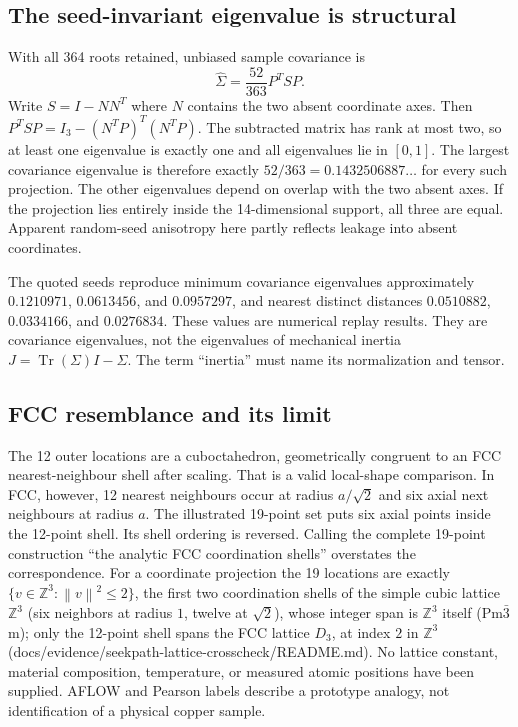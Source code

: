 \documentclass[11pt,a4paper]{article}
\newcommand{\tr}{\operatorname{Tr}}\newcommand{\TV}{\operatorname{TV}}\newcommand{\kerop}{\operatorname{ker}}\newcommand{\rank}{\operatorname{rank}}\newcommand{\diag}{\operatorname{diag}}\newcommand{\ran}{\operatorname{ran}}\newcommand{\norm}[1]{\left\lVert#1\right\rVert}\newcommand{\ket}[1]{\lvert#1\rangle}\newcommand{\bra}[1]{\langle#1\rvert}
\begin{document}
\subsection{The seed-invariant eigenvalue is structural}
With all 364 roots retained, unbiased sample covariance is
\begin{equation}
\widehat\Sigma=\frac{52}{363}P^TSP.
\end{equation}
Write $S=I-NN^T$ where $N$ contains the two absent coordinate axes. Then
$P^TSP=I_3-(N^TP)^T(N^TP)$. The subtracted matrix has rank at most two, so at least one eigenvalue is exactly one and all eigenvalues lie in $[0,1]$. The largest covariance eigenvalue is therefore exactly $52/363=0.1432506887\ldots$ for every such projection. The other eigenvalues depend on overlap with the two absent axes. If the projection lies entirely inside the 14-dimensional support, all three are equal. Apparent random-seed anisotropy here partly reflects leakage into absent coordinates.

The quoted seeds reproduce minimum covariance eigenvalues approximately $0.1210971$, $0.0613456$, and $0.0957297$, and nearest distinct distances $0.0510882$, $0.0334166$, and $0.0276834$. These values are numerical replay results. They are covariance eigenvalues, not the eigenvalues of mechanical inertia $J=\tr(\Sigma)I-\Sigma$. The term ``inertia'' must name its normalization and tensor.

\subsection{FCC resemblance and its limit}
The 12 outer locations are a cuboctahedron, geometrically congruent to an FCC nearest-neighbour shell after scaling. That is a valid local-shape comparison. In FCC, however, 12 nearest neighbours occur at radius $a/\sqrt2$ and six axial next neighbours at radius $a$. The illustrated 19-point set puts six axial points inside the 12-point shell. Its shell ordering is reversed. Calling the complete 19-point construction ``the analytic FCC coordination shells'' overstates the correspondence. For a coordinate projection the 19 locations are exactly $\{v\in\mathbb{Z}^3:\norm{v}^2\le2\}$, the first two coordination shells of the simple cubic lattice $\mathbb{Z}^3$ (six neighbors at radius $1$, twelve at $\sqrt2$), whose integer span is $\mathbb{Z}^3$ itself (Pm$\bar3$m); only the 12-point shell spans the FCC lattice $D_3$, at index $2$ in $\mathbb{Z}^3$ (docs/evidence/seekpath-lattice-crosscheck/README.md). No lattice constant, material composition, temperature, or measured atomic positions have been supplied. AFLOW and Pearson labels describe a prototype analogy, not identification of a physical copper sample.
\end{document}
